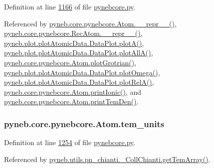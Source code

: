 Definition at line \hyperlink{pynebcore_8py_source_l01166}{1166} of file \hyperlink{pynebcore_8py_source}{pynebcore.\+py}.



Referenced by \hyperlink{pynebcore_8py_source_l02544}{pyneb.\+core.\+pynebcore.\+Atom.\+\_\+\+\_\+repr\+\_\+\+\_\+()}, \hyperlink{pynebcore_8py_source_l03032}{pyneb.\+core.\+pynebcore.\+Rec\+Atom.\+\_\+\+\_\+repr\+\_\+\+\_\+()}, \hyperlink{plot_atomic_data_8py_source_l00116}{pyneb.\+plot.\+plot\+Atomic\+Data.\+Data\+Plot.\+plot\+A()}, \hyperlink{plot_atomic_data_8py_source_l00188}{pyneb.\+plot.\+plot\+Atomic\+Data.\+Data\+Plot.\+plot\+All\+A()}, \hyperlink{pynebcore_8py_source_l02372}{pyneb.\+core.\+pynebcore.\+Atom.\+plot\+Grotrian()}, \hyperlink{plot_atomic_data_8py_source_l00372}{pyneb.\+plot.\+plot\+Atomic\+Data.\+Data\+Plot.\+plot\+Omega()}, \hyperlink{plot_atomic_data_8py_source_l00261}{pyneb.\+plot.\+plot\+Atomic\+Data.\+Data\+Plot.\+plot\+Rel\+A()}, \hyperlink{pynebcore_8py_source_l02167}{pyneb.\+core.\+pynebcore.\+Atom.\+print\+Ionic()}, and \hyperlink{pynebcore_8py_source_l02253}{pyneb.\+core.\+pynebcore.\+Atom.\+print\+Tem\+Den()}.

\hypertarget{classpyneb_1_1core_1_1pynebcore_1_1_atom_a218d09913e06d074a86466946eb221f5}{}
\subsubsection[{tem\+\_\+units}]{\setlength{\rightskip}{0pt plus 5cm}pyneb.\+core.\+pynebcore.\+Atom.\+tem\+\_\+units}\label{classpyneb_1_1core_1_1pynebcore_1_1_atom_a218d09913e06d074a86466946eb221f5}


Definition at line \hyperlink{pynebcore_8py_source_l01254}{1254} of file \hyperlink{pynebcore_8py_source}{pynebcore.\+py}.



Referenced by \hyperlink{pn__chianti_8py_source_l00521}{pyneb.\+utils.\+pn\+\_\+chianti.\+\_\+\+Coll\+Chianti.\+get\+Tem\+Array()}.

\hypertarget{classpyneb_1_1core_1_1pynebcore_1_1_atom_a044e1349bb63766a5f3d25fbf04b5c2c}{}
